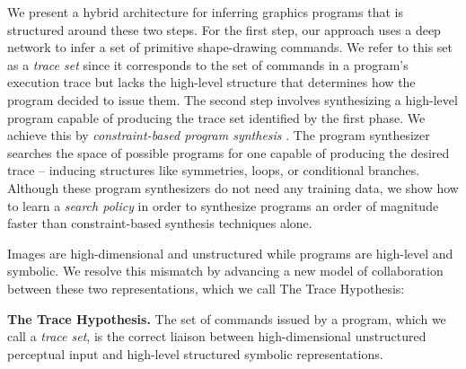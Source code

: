\documentclass{article}
\theoremstyle{definition}
\begin{document}
We present a hybrid architecture for inferring graphics programs that is structured around these two steps. For the first step, our approach uses a deep network to infer a set of primitive shape-drawing commands. We refer to this set as a \emph{trace set} since it corresponds to the set of commands in a program's execution trace but lacks the high-level structure that determines how the program decided to issue them.
The second step involves synthesizing a high-level program capable of producing the trace set identified by the first phase.
We achieve this by \emph{constraint-based program synthesis} \citep{solar2008program}. The program synthesizer searches the space of possible programs for one capable of producing the desired trace -- inducing structures like
symmetries, loops, or conditional branches.
Although these program synthesizers do not need any training data,
we show how to learn a \emph{search policy} 
in order to synthesize programs an order of magnitude faster than constraint-based synthesis techniques alone.

Images are high-dimensional and unstructured while programs are high-level
and symbolic. We resolve this mismatch by advancing a new model of
collaboration between these two representations, which we call The Trace Hypothesis:

\noindent \textbf{The Trace Hypothesis.} The set of commands issued by a program,
which we call a \emph{trace set},
is the correct liaison between high-dimensional unstructured perceptual input and high-level structured symbolic representations.
\end{document}
